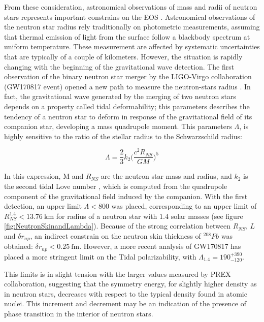 From these consideration, astronomical observations of mass and radii of neutron stars represents important constrains on the EOS .
Astronomical observations of the neutron star radius rely traditionally on photometric measurements, assuming that thermal emission of light from the surface follow a blackbody spectrum at uniform temperature. These measurement are affected by systematic uncertainties that are typically of a couple of kilometers.
However, the situation is rapidly changing with the beginning of the gravitational wave detection. The first observation of the binary neutron star merger by the LIGO-Virgo collaboration (GW170817 event) opened a new path to measure the neutron-stars radius \cite{LIGOScientific:2017vwq}. In fact, the gravitational wave generated by the merging of two neutron stars depends on a property called tidal deformability; this parameters describes the tendency of a neutron star to deform in response of the gravitational field of its companion star, developing a mass quadrupole moment. This parameters $\Lambda$, is highly sensitive to the ratio of the stellar radius to the Schwarzschild radius:

\begin{equation}
\Lambda = \frac{2}{3} k_{2} \big( \dfrac{c^{2} R_{NS}}{GM} \big)^{5}
\end{equation}

In this expression, M and $R_{NS}$ are the neutron star mass and radius, and $k_{2}$ is the second tidal Love number \cite{Binnington:2009bb}, which is computed from the quadrupole component of the gravitational field induced by the companion. With the first detection, an upper limit $\Lambda < 800$ was placed, corresponding to an upper limit of $R_{NS}^{1.4} < \SI{13.76}{\kilo \meter}$ \cite{Fattoyev_2018} for radius of a neutron star with $1.4$ solar masses (see figure \ref{fig:NeutronSkinandLambda}). Because of the strong correlation between $R_{NS}$, $L$ and $\delta r_{np}$, an indirect constrain on the neutron skin thickness of $^{208}Pb$ was obtained: $\delta r_{np} < \SI{0.25}{\femto \meter}$. However, a more recent analysis \cite{LIGOScientific:2018cki} of GW170817 has placed a more stringent limit on the Tidal polarizability, with $\Lambda_{1.4} = 190^{+390}_{-120}$.

 This limits is in slight tension with the larger values measured by PREX collaboration, suggesting that the symmetry energy, for slightly higher density as in neutron stars, decreases with respect to the typical density found in atomic nuclei. This increment and decrement may be an indication of the presence of phase transition in the interior of neutron stars.

